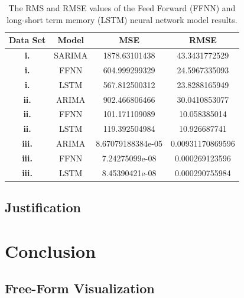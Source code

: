 \documentclass[10pt,a4paper]{article}
\begin{document}
\begin{table}[h]
\centering
\begin{tabular}{cccc}
Data Set & Model & MSE & RMSE \\ \hline
{\bf i.} & SARIMA & 1878.63101438 & 43.3431772529 \\
{\bf i.} & FFNN & 604.999299329 & 24.5967335093 \\
{\bf i.} & LSTM & 567.812500312 & 23.8288165949 \\ \hline 
{\bf ii.} & ARIMA & 902.466806466 & 30.0410853077 \\
{\bf ii.} & FFNN & 101.171109089 & 10.058385014 \\
{\bf ii.} & LSTM & 119.392504984 & 10.926687741 \\ \hline
{\bf iii.} & ARIMA & 8.67079188384e-05  &  0.00931170869596 \\
{\bf iii.} & FFNN & 7.24275099e-08 & 0.000269123596 \\
{\bf iii.} & LSTM & 8.45390421e-08 & 0.000290755984 \\ \hline
\end{tabular}
\caption{The RMS and RMSE values of the Feed Forward (FFNN) and long-short term memory (LSTM) neural network model results.}
\label{table: RMS values of neural network models}
\end{table}

\newpage
\subsection{Justification}
%


\section{Conclusion}
%
\subsection{Free-Form Visualization}
%
\end{document}
